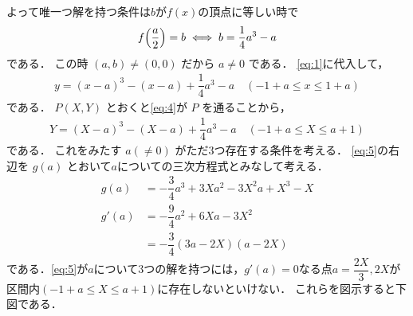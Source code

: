 \documentclass[../../main.tex]{subfiles}
\begin{document}
よって唯一つ解を持つ条件は$b$が$f(x)$の頂点に等しい時で
\begin{align}
  f\Bigl(\dfrac{a}{2}\Bigr) = b \iff b = \dfrac{1}{4}a^3 - a \label{eq:3}
\end{align}
である．
この時 $(a,b) \ne (0,0)$ だから $a \ne 0$ である．
\cref{eq:1}に代入して，
\begin{align}
  y = (x-a)^3 - (x-a) + \dfrac{1}{4}a^3 - a \quad (-1+a \le x \le 1+a) \label{eq:4}
\end{align}
である．
$P(X, Y)$ とおくと\cref{eq:4}が $P$ を通ることから，
\begin{align}
  Y = (X-a)^3 - (X-a) + \dfrac{1}{4}a^3 - a \quad (-1+a \le X \le a+1) \label{eq:5}
\end{align}
である．
これをみたす $a(\ne 0)$ がただ3つ存在する条件を考える．
\cref{eq:5}の右辺を $g(a)$ とおいて$a$についての三次方程式とみなして考える．
\begin{align}
  g(a) &= -\dfrac{3}{4}a^3 + 3X a^2 - 3X^2 a + X^3 - X \\
  g'(a) &= -\dfrac{9}{4}a^2 + 6X a - 3X^2 \\
  &= -\dfrac{3}{4}(3a-2X)(a-2X)
\end{align}
である．\cref{eq:5}が$a$について$3$つの解を持つには，$g'(a)=0$なる点$a=\dfrac{2X}{3},2X$が区間内$(-1+a \le X \le a+1)$に存在しないといけない．
これらを図示すると下図である．
\end{document}
